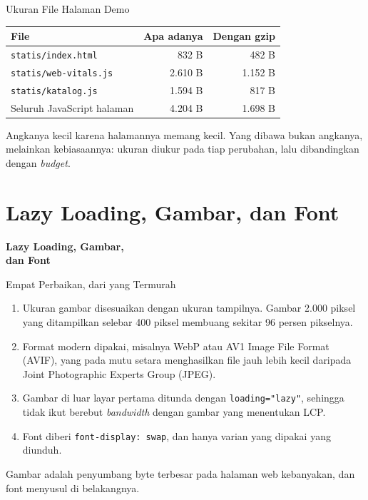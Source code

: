 \documentclass[aspectratio=169, table, 12pt]{beamer}
\begin{document}
\begin{frame}{{\Large Ukuran File Halaman Demo}}
  \vspace{6pt}
  \centering
  {\footnotesize
  \begin{tabularx}{\textwidth}{Yrr}
    \hline
    \textbf{File} & \textbf{Apa adanya} & \textbf{Dengan gzip} \\
    \hline
    \texttt{statis/index.html} & 832 B & 482 B \\
    \hline
    \texttt{statis/web-vitals.js} & 2.610 B & 1.152 B \\
    \hline
    \texttt{statis/katalog.js} & 1.594 B & 817 B \\
    \hline
    Seluruh JavaScript halaman & 4.204 B & 1.698 B \\
    \hline
  \end{tabularx}}

  \vspace{8pt}
  {\footnotesize Angkanya kecil karena halamannya memang kecil. Yang dibawa
  bukan angkanya, melainkan kebiasaannya: ukuran diukur pada tiap perubahan,
  lalu dibandingkan dengan \textit{budget}.}
\end{frame}

\section{Lazy Loading, Gambar, dan Font}

\begin{frame}{\hfill}
  \centering
  \Huge{\textbf{Lazy Loading, Gambar,\\dan Font}}
\end{frame}

\begin{frame}{{\Large Empat Perbaikan, dari yang Termurah}}
  \vspace{8pt}
  \begin{enumerate}
    \item Ukuran gambar disesuaikan dengan ukuran tampilnya. Gambar 2.000
          piksel yang ditampilkan selebar 400 piksel membuang sekitar 96
          persen pikselnya.
    \item Format modern dipakai, misalnya WebP atau AV1 Image File Format
          (AVIF), yang pada mutu setara menghasilkan file jauh lebih kecil
          daripada Joint Photographic Experts Group (JPEG).
    \item Gambar di luar layar pertama ditunda dengan
          \texttt{loading="lazy"}, sehingga tidak ikut berebut \textit{bandwidth} dengan
          gambar yang menentukan LCP.
    \item Font diberi \texttt{font-display: swap}, dan hanya varian yang
          dipakai yang diunduh.
  \end{enumerate}
  \vspace{4pt}
  {\footnotesize Gambar adalah penyumbang byte terbesar pada halaman web
  kebanyakan, dan font menyusul di belakangnya.}
\end{frame}
\end{document}
